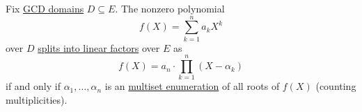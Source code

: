 \begin{theorem}\label{thm:polynomial_factorization_via_roots}
  Fix \hyperref[def:gcd_domain]{GCD domains} \( D \subseteq E \). The nonzero polynomial
  \begin{equation*}
    f(X) = \sum_{k=1}^n a_k X^k
  \end{equation*}
  over \( D \) \hyperref[def:polynomial_splits_into_linear_factors]{splits into linear factors} over \( E \) as
  \begin{equation*}
    f(X) = a_n \cdot \prod_{k=1}^n (X - \alpha_k)
  \end{equation*}
  if and only if \( \alpha_1, \ldots, \alpha_n \) is an \hyperref[def:multiset_enumeration]{multiset enumeration} of all roots of \( f(X) \) (counting multiplicities).
\end{theorem}

